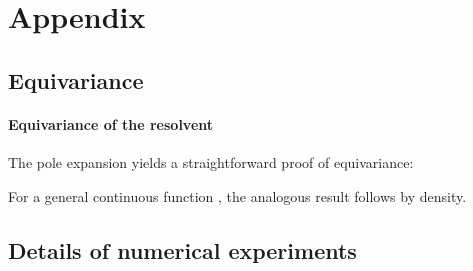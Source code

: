 \documentclass{article} \usepackage{iclr2024_conference,times}
\begin{document}



\clearpage
\appendix
\section{Appendix}
\subsection{Equivariance}
\label{sec:equivariant-op}





\paragraph{Equivariance of the resolvent}
The pole expansion yields a straightforward proof  of  equivariance:  

For a general continuous function , the analogous result follows by density.







\begin{comment}
\subsection{Proof of infinite order message passing}

(This is a very rough sketch of the proof, and it needs polish)


Let's consider a graph, where its representation is given by a set of matrices  constructed from the graph's edge and node features.

The message update mechanism for our model can be defined as:


Since the resolvent form a complete basis, a sufficiently large basis set (i.e., a large number of 's and 's) allows one to rewrite the formula as follows:

where  are arbitrary weights.

Applying this process again layer, we get:


From the above equation, it can be observed that this type of message passing behaves as an infinite-body-order infinite-layer message passing model after just two updates.
\end{comment}

\subsection{Details of numerical experiments}
\label{sec:appendix-numerical}
\end{document}

